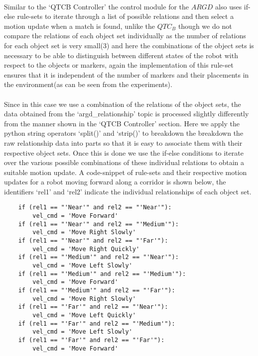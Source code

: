 \paragraph{} Similar to the `QTCB Controller' the control module for the $ARGD$ also uses if-else rule-sets to iterate through a list of possible relations and then select a motion update when a match is found, unlike the $QTC_B$ though we do not compare the relations of each object set individually as the number of relations for each object set is very small(3) and here the combinations of the object sets is necessary to be able to distinguish between different states of the robot with respect to the objects or markers, again the implementation of this rule-set ensures that it is independent of the number of markers and their placements in the environment(as can be seen from the experiments).
\paragraph{}Since in this case we use a combination of the relations of the object sets, the data obtained from the `argd\_relationship' topic is processed slightly differently from the manner shown in the `QTCB Controller' section. Here we apply the python string operators `split()' and `strip()' to breakdown the breakdown the raw relationship data into parts so that it is easy to associate them with their respective object sets. Once this is done we use the if-else conditions to iterate over the various possible combinations of these individual relations to obtain a suitable motion update. A code-snippet of rule-sets and their respective motion updates for a robot moving forward along a corridor is shown below, the identifiers `rel1' and `rel2' indicate the individual relationships of each object set.
\begin{verbatim}
	if (rel1 == "'Near'" and rel2 == "'Near'"):
		vel_cmd = 'Move Forward'
	if (rel1 == "'Near'" and rel2 == "'Medium'"):
		vel_cmd = 'Move Right Slowly'
	if (rel1 == "'Near'" and rel2 == "'Far'"):
		vel_cmd = 'Move Right Quickly'
	if (rel1 == "'Medium'" and rel2 == "'Near'"):
		vel_cmd = 'Move Left Slowly'
	if (rel1 == "'Medium'" and rel2 == "'Medium'"):
		vel_cmd = 'Move Forward'
	if (rel1 == "'Medium'" and rel2 == "'Far'"):
		vel_cmd = 'Move Right Slowly'
	if (rel1 == "'Far'" and rel2 == "'Near'"):
		vel_cmd = 'Move Left Quickly'
	if (rel1 == "'Far'" and rel2 == "'Medium'"):
		vel_cmd = 'Move Left Slowly'
	if (rel1 == "'Far'" and rel2 == "'Far'"):
		vel_cmd = 'Move Forward'
\end{verbatim}

